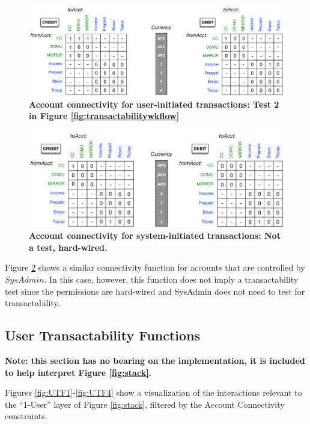 \begin{figure}[h]
\vspace{-0.5cm}
\centering
\includegraphics[width=16cm]{Figures/User_Acct_Connectivity}
\caption{\small\textbf{Account connectivity for user-initiated transactions: Test 2 in Figure \ref{fig:transactabilitywkflow}}}
\label{fig:User_Acct_Connectivity}
\end{figure}

\begin{figure}[H]
\vspace{-0.5cm}
\centering
\includegraphics[width=16cm]{Figures/SysAdmin_Acct_Connectivity}
\caption{\small\textbf{Account connectivity for system-initiated transactions: Not a test, hard-wired. }}
\label{fig:SysAdmin_Acct_Connectivity}
\end{figure}

Figure \ref{fig:SysAdmin_Acct_Connectivity} shows a similar connectivity function for accounts that are controlled by $SysAdmin$. In this case, however, this function does not imply a transactability test since the permissions are hard-wired and SysAdmin does not need to test for transactability.

\subsection{User Transactability Functions}
\textbf{\small Note: this section has no bearing on the implementation, it is included to help interpret Figure \ref{fig:stack}.}

Figures \ref{fig:UTF1}-\ref{fig:UTF4} show a visualization of the interactions relevant to the ``1-User'' layer of Figure \ref{fig:stack}, filtered by the Account Connectivity constraints.


